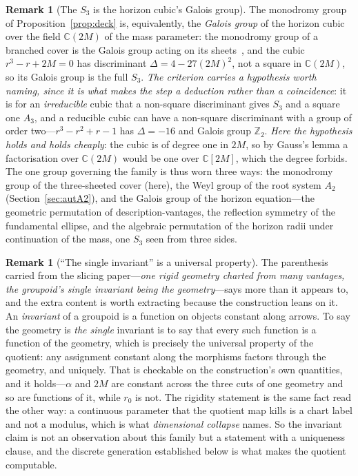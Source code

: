 \documentclass[11pt,a4paper]{article}
\theoremstyle{definition}
\newtheorem{remark}[theorem]{Remark}
\begin{document}
\begin{remark}[The $S_{3}$ is the horizon cubic's Galois group]\label{rem:galois}
The monodromy group of Proposition~\ref{prop:deck} is, equivalently, the \emph{Galois group} of the horizon cubic over the field $\mathbb{C}(2M)$ of the mass parameter: the monodromy group of a branched cover is the Galois group acting on its sheets~\cite{Harris1979}, and the cubic $r^{3}-r+2M=0$ has discriminant $\Delta=4-27(2M)^{2}$, not a square in $\mathbb{C}(2M)$, so its Galois group is the full $S_{3}$. \emph{The criterion carries a hypothesis worth naming, since it is what makes the step a deduction rather than a coincidence}: it is for an \emph{irreducible} cubic that a non-square discriminant gives $S_{3}$ and a square one $A_{3}$, and a reducible cubic can have a non-square discriminant with a group of order two---$r^{3}-r^{2}+r-1$ has $\Delta=-16$ and Galois group $\mathbb{Z}_{2}$. \emph{Here the hypothesis holds and holds cheaply}: the cubic is of degree one in $2M$, so by Gauss's lemma a factorisation over $\mathbb{C}(2M)$ would be one over $\mathbb{C}[2M]$, which the degree forbids. The one group governing the family is thus worn three ways: the monodromy group of the three-sheeted cover (here), the Weyl group of the root system $A_{2}$ (Section~\ref{sec:autA2}), and the Galois group of the horizon equation---the geometric permutation of description-vantages, the reflection symmetry of the fundamental ellipse, and the algebraic permutation of the horizon radii under continuation of the mass, one $S_{3}$ seen from three sides.
\end{remark}

\begin{remark}[``The single invariant'' is a universal property]\label{rem:universal}
The parenthesis carried from the slicing paper---\emph{one rigid geometry charted from many vantages, the
groupoid's single invariant being the geometry}---says more than it appears to, and the extra content is worth
extracting because the construction leans on it. An \emph{invariant} of a groupoid is a function on objects
constant along arrows. To say the geometry is \emph{the single} invariant is to say that every such function is
a function of the geometry, which is precisely the universal property of the quotient: any assignment constant
along the morphisms factors through the geometry, and uniquely. That is checkable on the construction's own
quantities, and it holds---$\alpha$ and $2M$ are constant across the three cuts of one geometry and so are
functions of it, while $r_{0}$ is not. The rigidity statement is the same fact
read the other way: a continuous parameter that the quotient map kills is a chart label and not a modulus,
which is what \emph{dimensional collapse} names. So the invariant claim is not an observation about this
family but a statement with a uniqueness clause, and the discrete generation established below is what makes
the quotient computable.
\end{remark}
\end{document}
